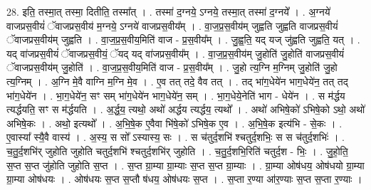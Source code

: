 \documentclass[17pt]{extarticle}
\begin{document}
28. इति॒ तस्मा॒त् तस्मा॒ दितीति॒ तस्मा᳚त् । . तस्मा॑ द॒ग्नये॒ ऽग्नये॒ तस्मा॒त् तस्मा॑ द॒ग्नये᳚ । . अ॒ग्नये॑ वाजप्रस॒वीयं॑ ॅवाजप्रस॒वीय॑ म॒ग्नये॒ ऽग्नये॑ वाजप्रस॒वीय᳚म् । . वा॒ज॒प्र॒स॒वीय॑म् जुह्वति जुह्वति वाजप्रस॒वीयं॑ ॅवाजप्रस॒वीय॑म् जुह्वति । . वा॒ज॒प्र॒स॒वीय॒मिति॑ वाज - प्र॒स॒वीय᳚म् । . जु॒ह्व॒ति॒ यद् यज् जु॑ह्वति जुह्वति॒ यत् । . यद् वा॑जप्रस॒वीयं॑ ॅवाजप्रस॒वीयं॒ ॅयद् यद् वा॑जप्रस॒वीय᳚म् । . वा॒ज॒प्र॒स॒वीय॑म् जु॒होति॑ जु॒होति॑ वाजप्रस॒वीयं॑ ॅवाजप्रस॒वीय॑म् जु॒होति॑ । . वा॒ज॒प्र॒स॒वीय॒मिति॑ वाज - प्र॒स॒वीय᳚म् । . जु॒हो त्य॒ग्नि म॒ग्निम् जु॒होति॑ जु॒हो त्य॒ग्निम् । . अ॒ग्नि मे॒वै वाग्नि म॒ग्नि मे॒व । . ए॒व तत् तदे॒ वैव तत् । . तद् भा॑ग॒धेये॑न भाग॒धेये॑न॒ तत् तद् भा॑ग॒धेये॑न । . भा॒ग॒धेये॑न॒ सꣳ सम् भा॑ग॒धेये॑न भाग॒धेये॑न॒ सम् । . भा॒ग॒धेये॒नेति॑ भाग - धेये॑न । . स म॑र्द्धय त्यर्द्धयति॒ सꣳ स म॑र्द्धयति । . अ॒र्द्ध॒य॒ त्यथो॒ अथो॑ अर्द्धय त्यर्द्धय॒ त्यथो᳚ । . अथो॑ अभिषे॒को॑ ऽभिषे॒को ऽथो॒ अथो॑ अभिषे॒कः । . अथो॒ इत्यथो᳚ । . अ॒भि॒षे॒क ए॒वैवा भि॑षे॒को॑ ऽभिषे॒क ए॒व । . अ॒भि॒षे॒क इत्य॑भि - से॒कः । . ए॒वास्या᳚ स्यै॒वै वास्य॑ । . अ॒स्य॒ स सो᳚ ऽस्यास्य॒ सः । . स च॑तुर्द॒शभि॑ श्चतुर्द॒शभिः॒ स स च॑तुर्द॒शभिः॑ । . च॒तु॒र्द॒शभि॑र् जुहोति जुहोति चतुर्द॒शभि॑ श्चतुर्द॒शभि॑र् जुहोति । . च॒तु॒र्द॒शभि॒रिति॑ चतुर्द॒श - भिः॒ । . जु॒हो॒ति॒ स॒प्त स॒प्त जु॑होति जुहोति स॒प्त । . स॒प्त ग्रा॒म्या ग्रा॒म्याः स॒प्त स॒प्त ग्रा॒म्याः । . ग्रा॒म्या ओष॑धय॒ ओष॑धयो ग्रा॒म्या ग्रा॒म्या ओष॑धयः । . ओष॑धयः स॒प्त स॒प्तौ ष॑धय॒ ओष॑धयः स॒प्त । . स॒प्ता र॒ण्या आ॑र॒ण्याः स॒प्त स॒प्ता र॒ण्याः । \newline
\end{document}
